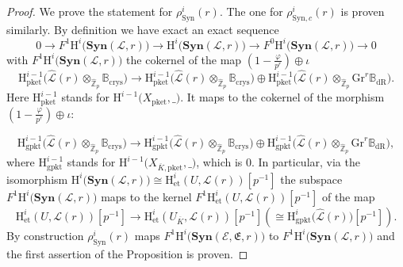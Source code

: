 \documentclass[asterisque,english]{smfart}
\begin{document}
\begin{proof}  
We prove the statement for $\rho_{\mathrm{Syn}}^i(r) $. The one for $\rho_{\mathrm{Syn},c}^i(r) $ is proven similarly. By definition we have exact an exact sequence $$0 \longrightarrow F^1 \mathrm{H}^i\bigl(\mathbf{Syn}(\mathcal{L},r)\bigr)\longrightarrow \mathrm{H}^i\bigl(\mathbf{Syn}(\mathcal{L},r)\bigr) \longrightarrow F^0 \mathrm{H}^i\bigl(\mathbf{Syn}(\mathcal{L},r)\bigr) \longrightarrow 0$$with   $F^1 \mathrm{H}^i\bigl(\mathbf{Syn}(\mathcal{L},r)\bigr)$ the cokernel of the map $(1-\frac{\varphi}{p^r}) \oplus   \iota$ $$ \mathrm{H}^{i-1}_{\mathrm{pket}}\bigl( \widehat{\mathcal{L}}(r)\otimes_{\widehat{\mathbb{Z}}_p} \mathbb{B}_{\mathrm{crys}}  \bigr) \to \mathrm{H}^{i-1}_{\mathrm{pket}}\bigl(\widehat{\mathcal{L}}(r)\otimes_{\widehat{\mathbb{Z}}_p} \mathbb{B}_{\mathrm{crys}} \bigr) \oplus \mathrm{H}^{i-1}_{\mathrm{pket}}\bigl( \widehat{\mathcal{L}}(r)\otimes_{\widehat{\mathbb{Z}}_p}\mathrm{Gr}^r \mathbb{B}_{\mathrm{dR}} \bigr).$$Here $\mathrm{H}^{i-1}_{\mathrm{pket}}$ stands for $\mathrm{H}^{i-1}\bigl(X_{\mathrm{pket}},\_\bigr) $.
It maps to the cokernel of  the morphism $(1-\frac{\varphi}{p^r}) \oplus   \iota$:

\begin{equation}\label{eq:gpkt}
\mathrm{H}^{i-1}_{\mathrm{gpkt}}\bigl( \widehat{\mathcal{L}}(r)\otimes_{\widehat{\mathbb{Z}}_p} \mathbb{B}_{\mathrm{crys}}  \bigr) \longrightarrow \mathrm{H}^{i-1}_{\mathrm{gpkt}}\bigl(\widehat{\mathcal{L}}(r)\otimes_{\widehat{\mathbb{Z}}_p} \mathbb{B}_{\mathrm{crys}} \bigr) \oplus \mathrm{H}^{i-1}_{\mathrm{gpkt}}\bigl( \widehat{\mathcal{L}}(r)\otimes_{\widehat{\mathbb{Z}}_p}\mathrm{Gr}^r \mathbb{B}_{\mathrm{dR}} \bigr),
\end{equation} 
where $\mathrm{H}^{i-1}_{ \mathrm{gpkt}}$ stands for $\mathrm{H}^{i-1}\bigl(X_{\overline{K},\mathrm{pket}},\_\bigr) $, which is $0$.  In particular, via  the isomorphism  $\mathrm{H}^i\bigl(\mathbf{Syn}(\mathcal{L},r)\bigr)\cong\mathrm{H}_{\mathrm{et}}^{i}\left( U,\mathcal{L}\left(
r\right) \right)[p^{-1}] $ the subspace $F^1\mathrm{H}^i\bigl(\mathbf{Syn}(\mathcal{L},r)\bigr)$ maps to the kernel $F^1 \mathrm{H}_{\mathrm{et}}^{i}\left( U,\mathcal{L}\left(
r\right) \right)[p^{-1}] $ of the map  $$\mathrm{H}_{\mathrm{et}}^{i}\left( U,\mathcal{L}\left(
r\right) \right) [p^{-1}]\longrightarrow \mathrm{H}_{\mathrm{et}}^{i}\left( U_{\overline{K}},\mathcal{L}\left(
r\right) \right)[p^{-1}]  ( \cong \mathrm{H}^i_{\mathrm{gpkt}}\bigl( \widehat{\mathcal{L}}(r)\bigr)[p^{-1}]).$$By construction  $\rho_{\mathrm{Syn}}^i(r) $ maps $F^1 \mathrm{H}^i\bigl(\mathbf{Syn}(\mathcal{E},\mathfrak{E},r)\bigr)$ to $F^1 \mathrm{H}^i\bigl(\mathbf{Syn}(\mathcal{L},r)\bigr)$ and the first assertion of the Proposition  is proven.


\end{proof}
\end{document}
